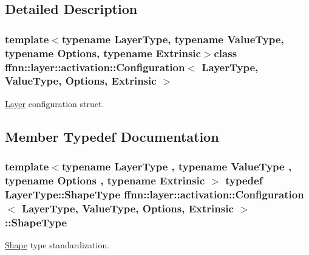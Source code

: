 \subsection{Detailed Description}
\subsubsection*{template$<$typename Layer\-Type, typename Value\-Type, typename Options, typename Extrinsic$>$class ffnn\-::layer\-::activation\-::\-Configuration$<$ Layer\-Type, Value\-Type, Options, Extrinsic $>$}

\hyperlink{classffnn_1_1layer_1_1_layer}{Layer} configuration struct. 

\subsection{Member Typedef Documentation}
\hypertarget{classffnn_1_1layer_1_1activation_1_1_configuration_a832eb6a16c052e532341dcf1a5a03f0d}{
\subsubsection[{Shape\-Type}]{\setlength{\rightskip}{0pt plus 5cm}template$<$typename Layer\-Type , typename Value\-Type , typename Options , typename Extrinsic $>$ typedef Layer\-Type\-::\-Shape\-Type {\bf ffnn\-::layer\-::activation\-::\-Configuration}$<$ {\bf Layer\-Type}, Value\-Type, Options, Extrinsic $>$\-::{\bf Shape\-Type}}}\label{classffnn_1_1layer_1_1activation_1_1_configuration_a832eb6a16c052e532341dcf1a5a03f0d}


\hyperlink{structffnn_1_1layer_1_1_shape}{Shape} type standardization. 



